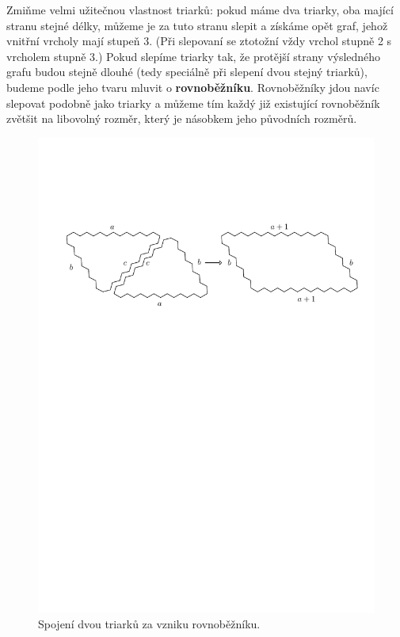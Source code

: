 Zmiňme velmi užitečnou vlastnost triarků: pokud máme dva triarky, oba mající stranu stejné délky, můžeme je za tuto stranu slepit a získáme opět graf, jehož vnitřní vrcholy mají stupeň 3. (Při slepovaní se ztotožní vždy vrchol stupně 2 s vrcholem stupně 3.) Pokud slepíme triarky tak, že protější strany výsledného grafu budou stejně dlouhé (tedy speciálně při slepení dvou stejný triarků), budeme podle jeho tvaru mluvit o \textbf{rovnoběžníku}. Rovnoběžníky jdou navíc slepovat podobně jako triarky a můžeme tím každý již existující rovnoběžník zvětšit na libovolný rozměr, který je násobkem jeho původních rozměrů.


\begin{figure}[h!]\centering
\includegraphics[width=\textwidth]{../img/T-P}
\caption{Spojení dvou triarků za vzniku rovnoběžníku.}
\label{obr21:T-P}
\end{figure}

